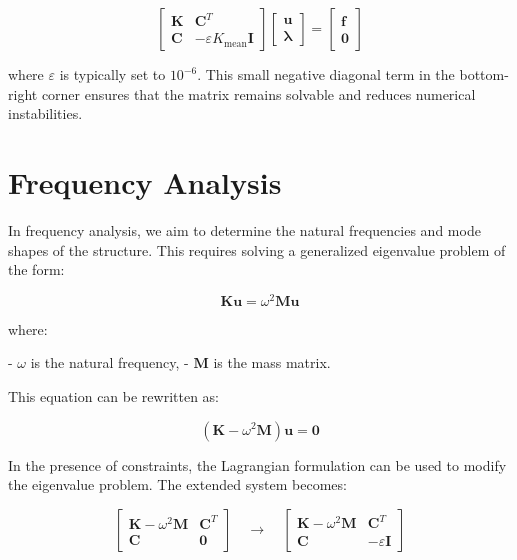 \begin{equation}
\begin{bmatrix}
\mathbf{K} & \mathbf{C}^T \\
\mathbf{C} & -\varepsilon K_{\text{mean}} \mathbf{I}
\end{bmatrix}
\begin{bmatrix}
\boldsymbol{u} \\
\boldsymbol{\lambda}
\end{bmatrix}
=
\begin{bmatrix}
\boldsymbol{f} \\
\boldsymbol{0}
\end{bmatrix}
\end{equation}

where \(\varepsilon\) is typically set to \( 10^{-6} \).
This small negative diagonal term in the bottom-right corner ensures that the matrix remains solvable and reduces numerical instabilities.

\section{Frequency Analysis}

In frequency analysis, we aim to determine the natural frequencies and mode shapes of the structure. This requires solving a generalized eigenvalue problem of the form:

\begin{equation}
\mathbf{K} \boldsymbol{u} = \omega^2 \mathbf{M} \boldsymbol{u}
\end{equation}

where:

- \(\omega\) is the natural frequency,
- \(\mathbf{M}\) is the mass matrix.

This equation can be rewritten as:

\begin{equation}
(\mathbf{K} - \omega^2 \mathbf{M}) \boldsymbol{u} = \boldsymbol{0}
\end{equation}

In the presence of constraints, the Lagrangian formulation can be used to modify the eigenvalue problem. The extended system becomes:

\begin{equation}
\begin{bmatrix}
\mathbf{K} - \omega^2 \mathbf{M} & \mathbf{C}^T \\
\mathbf{C} & \mathbf{0}
\end{bmatrix}
\quad \longrightarrow \quad
\begin{bmatrix}
\mathbf{K} - \omega^2 \mathbf{M} & \mathbf{C}^T \\
\mathbf{C} & -\varepsilon \mathbf{I}
\end{bmatrix}
\end{equation}

